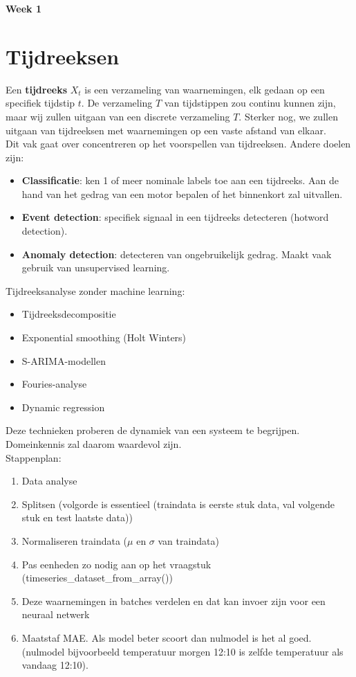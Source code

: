 {\large
\textbf{{\LARGE Week 1}}
\section{Tijdreeksen}
Een \textbf{tijdreeks} $X_t$ is een verzameling van waarnemingen, elk gedaan op een specifiek tijdstip $t$. De verzameling $T$ van tijdstippen zou continu kunnen zijn, maar wij zullen uitgaan van een discrete verzameling $T$. Sterker nog, we zullen uitgaan van tijdreeksen met waarnemingen op een vaste afstand van elkaar.\\

Dit vak gaat over concentreren op het voorspellen van tijdreeksen. Andere doelen zijn:
\begin{itemize}
    \item \textbf{Classificatie}: ken 1 of meer nominale labels toe aan een tijdreeks. Aan de hand van het gedrag van een motor bepalen of het binnenkort zal uitvallen.
    \item \textbf{Event detection}: specifiek signaal in een tijdreeks detecteren (hotword detection).
    \item \textbf{Anomaly detection}: detecteren van ongebruikelijk gedrag. Maakt vaak gebruik van unsupervised learning.
\end{itemize}

\noindent Tijdreeksanalyse zonder machine learning:
\begin{itemize}
    \item Tijdreeksdecompositie
    \item Exponential smoothing (Holt Winters)
    \item S-ARIMA-modellen
    \item Fouries-analyse
    \item Dynamic regression
\end{itemize}
\noindent Deze technieken proberen de dynamiek van een systeem te begrijpen. Domeinkennis zal daarom waardevol zijn.\\

\noindent Stappenplan:
\begin{enumerate}
    \item Data analyse
    \item Splitsen (volgorde is essentieel (traindata is eerste stuk data, val volgende stuk en test laatste data))
    \item Normaliseren traindata ($\mu$ en $\sigma$ van traindata)
    \item Pas eenheden zo nodig aan op het vraagstuk (timeseries\_dataset\_from\_array())
    \item Deze waarnemingen in batches verdelen en dat kan invoer zijn voor een neuraal netwerk
    \item Maatstaf MAE. Als model beter scoort dan nulmodel is het al goed. (nulmodel bijvoorbeeld temperatuur morgen 12:10 is zelfde temperatuur als vandaag 12:10).
\end{enumerate}
}
